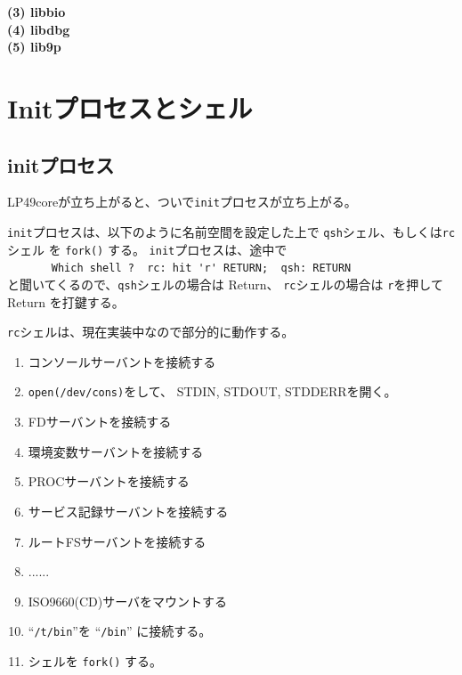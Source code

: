 {{\bf\flushleft  (3) libbio}\\

  
{\bf\flushleft  (4) libdbg}\\

  
{\bf\flushleft  (5) lib9p}\\


\newpage
\part{Initプロセスとシェル}

\chapter{initプロセス}

LP49coreが立ち上がると、ついで{\tt init}プロセスが立ち上がる。

{\tt init}プロセスは、以下のように名前空間を設定した上で
{\tt qsh}シェル、もしくは{\tt rc}シェル を {\tt fork()} する。
{\tt init}プロセスは、途中で \\
　\verb|     Which shell ?  rc: hit 'r' RETURN;  qsh: RETURN| \\
と聞いてくるので、{\tt qsh}シェルの場合は Return、
{\tt rc}シェルの場合は {\tt r}を押して Return を打鍵する。

{\tt rc}シェルは、現在実装中なので部分的に動作する。

\begin{enumerate}
\item  コンソールサーバントを接続する
\item  \verb|open(/dev/cons)|をして、
       STDIN, STDOUT, STDDERRを開く。

\item  FDサーバントを接続する
\item  環境変数サーバントを接続する
\item  PROCサーバントを接続する
\item  サービス記録サーバントを接続する
\item  ルートFSサーバントを接続する
\item  ......
\item  ISO9660(CD)サーバをマウントする

\item  ``{\tt /t/bin}''を ``{\tt /bin}'' に接続する。

\item  シェルを {\tt fork()} する。

\end{enumerate}



}
